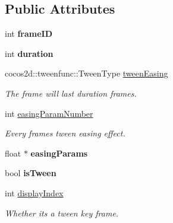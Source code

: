 \subsection*{Public Attributes}
\begin{DoxyCompactItemize}
\item 
\mbox{\label{classcocostudio_1_1FrameData_a4ee16ed9160ae97b283cd5f115cecc78}} 
int {\bfseries frame\+ID}
\item 
\mbox{\label{classcocostudio_1_1FrameData_a93722507d7edb6de79f9e89246db224b}} 
int {\bfseries duration}
\item 
\mbox{\label{classcocostudio_1_1FrameData_a37789c69b8f72735a06d4f187e7299c6}} 
cocos2d\+::tweenfunc\+::\+Tween\+Type \hyperlink{classcocostudio_1_1FrameData_a37789c69b8f72735a06d4f187e7299c6}{tween\+Easing}
\begin{DoxyCompactList}\small\item\em The frame will last duration frames. \end{DoxyCompactList}\item 
\mbox{\label{classcocostudio_1_1FrameData_a85dbe41cf050f0b94b72c3a750af163f}} 
int \hyperlink{classcocostudio_1_1FrameData_a85dbe41cf050f0b94b72c3a750af163f}{easing\+Param\+Number}
\begin{DoxyCompactList}\small\item\em Every frame\textquotesingle{}s tween easing effect. \end{DoxyCompactList}\item 
\mbox{\label{classcocostudio_1_1FrameData_a26be5dd1a46aeac06af6908d41ae8220}} 
float $\ast$ {\bfseries easing\+Params}
\item 
\mbox{\label{classcocostudio_1_1FrameData_a310b41c355a0ca833607606bf295f810}} 
bool {\bfseries is\+Tween}
\item 
int \hyperlink{classcocostudio_1_1FrameData_a10e7f63afde518658d479596c8f85247}{display\+Index}
\begin{DoxyCompactList}\small\item\em Whether it\textquotesingle{}s a tween key frame. \end{DoxyCompactList}\item 

\end{DoxyCompactItemize}

